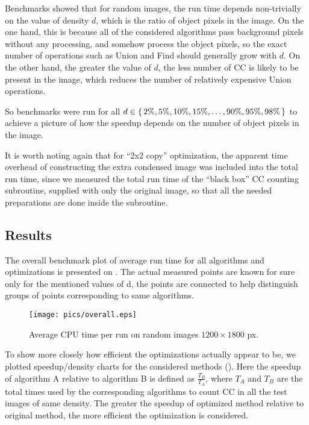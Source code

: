\documentclass[hidelinks]{llncs}
\begin{document}
Benchmarks showed that for random images, the run time depends non-trivially on
the value of density $d$, which is the ratio of object pixels in the image. On
the one hand, this is because all of the considered algorithms pass background
pixels without any processing, and somehow process the object pixels, so the
exact number of operations such as Union and Find should generally grow with
$d$. On the other hand, the greater the value of $d$, the less number of CC is
likely to be present in the image, which reduces the number of relatively
expensive Union operations.

So benchmarks were run for all $d \in \set{2\%, 5\%, 10\%, 15\%, \ldots, 90\%,
95\%, 98\%}$ to achieve a picture of how the speedup depends on the number of
object pixels in the image.

It is worth noting again that for ``2x2 copy'' optimization, the apparent time
overhead of constructing the extra condensed image was included into the total
run time, since we measured the total run time of the ``black box'' CC counting
subroutine, supplied with only the original image, so that all the needed
preparations are done inside the subroutine.

\subsection{Results}

The overall benchmark plot of average run time for all algorithms and
optimizations is presented on . The actual measured points are
known for sure only for the mentioned values of d, the points are connected to
help distinguish groups of points corresponding to same algorithms.

\begin{figure}
  \centering
  \texttt{[image: pics/overall.eps]}
  \caption{Average CPU time per run on random images $1200 \times 1800$ px.}
  \label{fig:overall}
\end{figure}

To show more closely how efficient the optimizations actually appear to be, we
plotted speedup/density charts for the considered methods ().
Here the speedup of algorithm A relative to algorithm B is defined as
$\frac{T_B}{T_A}$, where $T_A$ and $T_B$ are the total times used by the
corresponding algorithms to count CC in all the test images of same density.
The greater the speedup of optimized method relative to original method, the
more efficient the optimization is considered.
\end{document}
